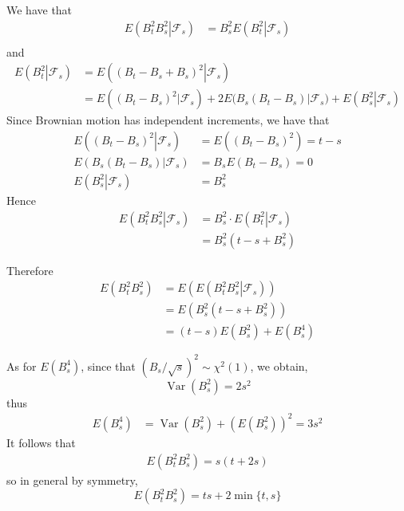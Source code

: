 \documentclass{homework}
\DeclareMathOperator{\Var}{Var}
\begin{document}
    We have that
    \begin{align*}
        E\left.\left(B_t^2B_s^2\right|\mathcal F_s\right)
        &=B_s^2E\left.\left(B_t^2\right|\mathcal F_s\right)\\
    \end{align*}
    and
    \begin{align*}
        E\left.\left(B_t^2\right|\mathcal F_s\right)
        &=E\left.\left((B_t-B_s+B_s)^2\right|\mathcal F_s\right)\\
        &=E\left((B_t-B_s)^2|\mathcal F_s\right)
            +2E\big(B_s(B_t-B_s)|\mathcal F_s\big)
            +E\left.\left(B_s^2\right|\mathcal F_s\right)
    \end{align*}
    Since Brownian motion has independent increments, we have
    that
    \begin{align*}
    E\left.\left((B_t-B_s)^2\right|\mathcal F_s\right)
    &=E\left((B_t-B_s)^2\right)=t-s\\
    E\left.\left(B_s(B_t-B_s)\right|\mathcal F_s\right)&=B_sE(B_t-B_s)=0\\
    E\left.\left(B_s^2\right|\mathcal F_s\right)&=B_s^2
    \end{align*}
    Hence
    \begin{align*}
        E\left.\left(B_t^2B_s^2\right|\mathcal F_s\right)
        &=B_s^2\cdot E\left.\left(B_t^2\right|\mathcal F_s\right)\\
        &=B_s^2\left(t-s+B_s^2\right)
    \end{align*} 

    Therefore
    \begin{align*}
    E\left(B_t^2B_s^2\right)&=E\left(E\left.\left(B_t^2B_s^2\right|\mathcal F_s\right)\right)\\
    &=E\left(B_s^2\left(t-s+B_s^2\right)\right)\\
    &=(t-s)E\left(B_s^2\right)+E\left(B_s^4\right)
    \end{align*}


    As for $E\left(B_s^4\right)$, since that $\left(B_s/\sqrt{s}\right)^2
    \sim\chi^2(1)$, we obtain,
    \[\Var(B_s^2)=2s^2\]
    thus
    \begin{align*}
        E\left(B_s^4\right)&=\Var\left(B_s^2\right)+\left(E\left(B_s^2\right)\right)^2=3s^2
    \end{align*}
    It follows that
    \begin{align*}
    E\left(B_t^2B_s^2\right)=s(t+2s)
    \end{align*}
    so in general by symmetry,
    \begin{equation}
        \label{eq:EBs2Bt2}
        E\left(B_t^2B_s^2\right)=ts+2\min\{t,s\}
    \end{equation}
\end{document}

